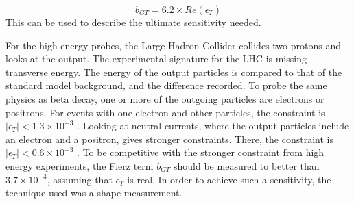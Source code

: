\documentclass[../MaxHughesThesis.tex]{subfiles}
\begin{document}
\begin{equation}
	b_{GT} =  6.2 \times Re(\epsilon_{T})
	\label{eq:bgtpropor}
\end{equation}
This can be used to describe the ultimate sensitivity needed.

For the high energy probes, the Large Hadron Collider collides two protons and looks at the output. 
The experimental signature for the LHC is missing transverse energy.
The energy of the output particles is compared to that of the standard model background, and the difference recorded.
To probe the same physics as beta decay, one or more of the outgoing particles are electrons or positrons.
For events with one electron and other particles, the constraint is $|\epsilon_{T}| < 1.3 \times 10^{-3}$ \cite{Gon13}.
Looking at neutral currents, where the output particles include an electron and a positron, gives stronger constraints.
There, the constraint is $|\epsilon_{T}| < 0.6 \times 10^{-3}$ \cite{Fal17}.
To be competitive with the stronger constraint from high energy experiments, the Fierz term $b_{GT}$ should be measured to better than $3.7 \times 10^{-3}$, assuming that $\epsilon_{T}$ is real. 
In order to achieve such a sensitivity, the technique used was a shape measurement.
\end{document}
